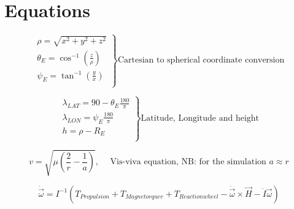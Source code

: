 \chapter{Equations}

\begin{equation}\label{cart2spheric}
	\left.
	\begin{array}{lll}
		\rho = \sqrt{x^2+y^2+z^2}\\
		\theta_E = \cos^{-1}\left(\frac{z}{\rho}\right)\\
		\psi_E = \tan^{-1}\left(\frac{y}{x}\right)\\
	\end{array}
	\right \} \text{Cartesian to spherical coordinate conversion}
\end{equation}

\begin{equation}\label{spheric2latlong}
	\left.
	\begin{array}{lll}
		\lambda_{LAT} = 90-\theta_E\frac{180}{\pi}\\
		\lambda_{LON} = \psi_E\frac{180}{\pi}\\
		h = \rho-R_E\\
	\end{array}
	\right \} \text{Latitude, Longitude and height}
\end{equation}

\begin{equation}\label{visviva}
	v = \sqrt{\mu\left(\frac{2}{r}-\frac{1}{a}\right)},\hspace{15pt}\text{Vis-viva equation, NB: for the simulation }a\approx r
\end{equation}

\begin{equation}\label{rotinertial}
	\dot{\vec{\omega}} = I^{-1}\left(T_{Propulsion} + T_{Magnetorquer} + T_{Reactionwheel} - \dot{\vec{\omega}}\times\vec{H} - \dot{I}\vec{\omega}\right)
\end{equation}


